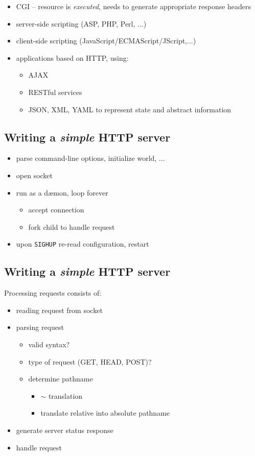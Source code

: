 \documentclass[xga]{xdvislides}
\begin{document}
\begin{itemize}
	\item CGI -- resource is {\em executed}, needs to generate
		appropriate response headers
	\item server-side scripting (ASP, PHP, Perl, ...)
	\item client-side scripting (JavaScript/ECMAScript/JScript,...)
	\item applications based on HTTP, using:
		\begin{itemize}
			\item AJAX
			\item RESTful services
			\item JSON, XML, YAML to represent state and
				abstract information
		\end{itemize}
\end{itemize}

\subsection{Writing a {\em simple} HTTP server}
\begin{itemize}
	\item parse command-line options, initialize world, ...
	\item open socket
	\item run as a d\ae mon, loop forever
		\begin{itemize}
			\item accept connection
			\item fork child to handle request
		\end{itemize}
	\item upon {\tt SIGHUP} re-read configuration, restart
\end{itemize}

\subsection{Writing a {\em simple} HTTP server}
Processing requests consists of:
\begin{itemize}
	\item reading request from socket
	\item parsing request
		\begin{itemize}
			\item valid syntax?
			\item type of request (GET, HEAD, POST)?
			\item determine pathname
				\begin{itemize}
					\item $\sim$ translation
					\item translate relative into absolute pathname
				\end{itemize}
		\end{itemize}
	\item generate server status response
	\item handle request
\end{itemize}
\end{document}
